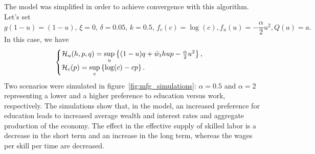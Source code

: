         The model was simplified in order to achieve convergence with this algorithm. 
        Let's set 
        $$g(1- u) = (1 - u),\,\xi = 0,\, \delta = 0.05, \, k = 0.5,\, f_c(c) = \log(c), f_u(u) = -\frac{\alpha}{2} u^2, Q(a) = a.$$        
        In this case, we have 
        \begin{equation}
            \begin{cases}    
            \mathcal{H}_u(h,p,q) = \sup\limits_{u} \left\{ (1 - u)q + \bar w_t h u p - \frac{\alpha}{2} u^2 \right\},\\
            \mathcal{H}_c (p) = \sup\limits_{c} \left\{ \log(c) - cp \right\}.
            \end{cases}
        \end{equation} 
        Two scenarios were simulated in figure~\eqref{fig:mfg_simulations}: $\alpha = 0.5$ and  $\alpha = 2$ representing a lower and a higher preference to education versus work, respectively.
        The simulations show that, in the model, an increased preference for education leads to increased average wealth and interest rates and aggregate production of the economy. The effect in the effective supply of skilled labor is a decrease in the short term and an increase in the long term, whereas the wages per skill per time are decreased.


